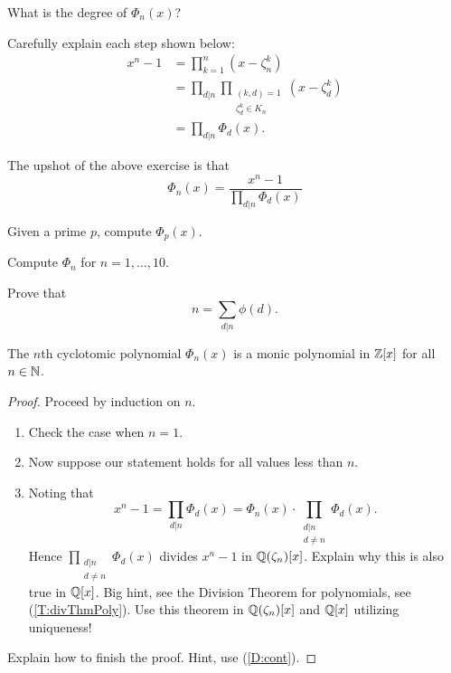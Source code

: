 \documentclass{ximera}
\begin{document}
\begin{exercise}
  What is the degree of $\Phi_n(x)$?
\end{exercise}

\begin{exercise}
  Carefully explain each step shown below:
  \begin{align*}
    x^n - 1 &= \prod_{k=1}^n (x-\zeta_n^k) \\
    &=\prod_{d|n}\prod_{\substack{(k,d) = 1\\ \zeta_d^k \in K_n}}(x-\zeta_d^k) \\
    &=\prod_{d|n} \Phi_d(x).
  \end{align*}
\end{exercise}

\begin{corollary}
  The upshot of the above exercise is that 
  \[
  \Phi_n(x) = \frac{x^n-1}{\prod_{d|n} \Phi_d(x)}
  \]
\end{corollary}

\begin{exercise}
  Given a prime $p$, compute $\Phi_p(x)$. 
\end{exercise}

\begin{exercise}
  Compute $\Phi_n$ for $n = 1, \dots, 10$.
\end{exercise}

\begin{exercise}
  Prove that 
  \[
  n = \sum_{d|n} \phi(d).
  \]
\end{exercise}


\begin{theorem} 
  The $n$th cyclotomic polynomial $\Phi_n(x)$ is a monic polynomial in
  $\mathbb Z[x]$ for all $n\in \mathbb N$.
  
  \begin{proof} Proceed by induction on $n$.
    \begin{enumerate}
    \item Check the case when $n = 1$. 
    \item Now suppose our statement holds for all values less than $n$.
    \item Noting that 
      \[
      x^n - 1 = \prod_{d|n}\Phi_d(x) = \Phi_n(x)\cdot \prod_{\substack{d|n\\ d \ne n}}\Phi_d(x).
      \]
      Hence $\prod_{\substack{d|n\\ d \ne n}}\Phi_d(x)$ divides $x^n-1$ in
      $\mathbb Q(\zeta_n)[x]$. Explain why this is also true in $\mathbb Q[x]$. Big hint,
      see the Division Theorem for polynomials, see
      (\ref{T:divThmPoly}). Use this theorem in $\mathbb Q(\zeta_n)[x]$ and $\mathbb Q[x]$
      utilizing uniqueness!
    \end{enumerate}
    Explain how to finish the proof. Hint, use (\ref{D:cont}).
  \end{proof}
\end{theorem}
\end{document}

